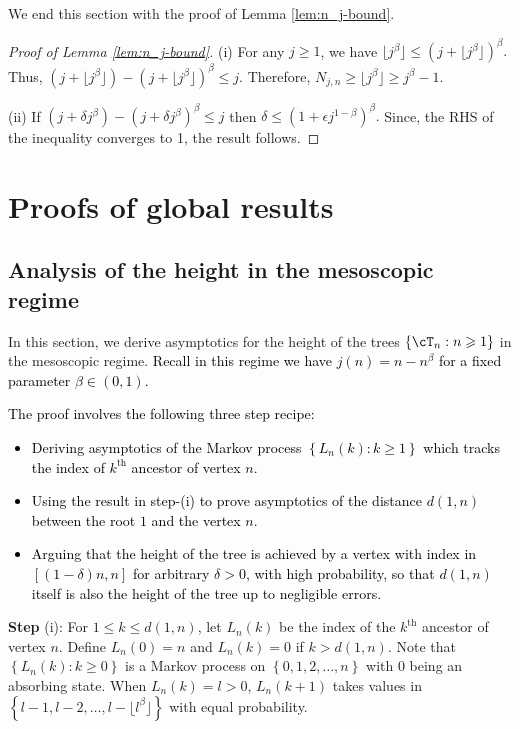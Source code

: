 \documentclass[letterpaper,11pt,reqno]{amsart}
\theoremstyle{definition}
\renewcommand{\le}{\leqslant}
\renewcommand{\leq}{\leqslant}
\renewcommand{\geq}{\geqslant}
\newcommand{\set}[1]{\left\{#1\right\}}
\begin{document}
We end this section with the proof of Lemma \ref{lem:n_j-bound}.
\begin{proof}[Proof of Lemma \ref{lem:n_j-bound}]

    (i) For any $j \geq 1$, we have $\lfloor j^\beta\rfloor \leq (j+\lfloor j^\beta\rfloor)^\beta.$ Thus, $(j+\lfloor j^\beta\rfloor) - (j+\lfloor j^\beta\rfloor)^\beta \leq j.$ Therefore, $N_{j,n} \geq \lfloor j^\beta\rfloor \geq j^\beta -1.$

    (ii) If $(j+\delta j^\beta) - (j+\delta j^\beta)^\beta \leq j$ then $\delta \leq  (1+\epsilon j^{1-\beta})^\beta.$ Since, the RHS of the inequality converges to 1, the result follows. 

\end{proof}

\section{Proofs of global results}

\subsection{Analysis of the height in the mesoscopic regime}

In this section, we derive asymptotics for the height of the trees $\set{\cT_n:n\geq 1}$ in the mesoscopic regime. \textcolor{black}{Recall in this regime we have $j(n)=n-n^{\beta}$ for a fixed parameter $\beta \in (0,1)$.} \textcolor{black}{The proof involves the following three step recipe:
\begin{itemize}
    \item[(i)] Deriving asymptotics of the Markov process $\set{L_n(k):k\geq 1}$ which tracks the index of $k^{\text{th}}$ ancestor of vertex $n$.
    \item[(ii)] Using the result in step-(i) to prove asymptotics of the distance $d(1,n)$ between the root $1$ and the vertex $n$.
    \item[(iii)] Arguing that the height of the tree is achieved by a vertex with index in $[(1-\delta) n,n]$ for arbitrary $\delta>0$, with high probability, so that $d(1,n)$ itself is also the height of the tree up to negligible errors. 
\end{itemize}
}


\textbf{Step} (i): For $1\le k\le d(1,n)$, let $L_n(k)$ be the index of the $k^{\text{th}}$ ancestor of vertex $n$. Define $L_n(0)=n$ and $L_n(k)=0$ if $k > d(1,n)$. Note that $\set{L_n(k):k\geq 0}$ is a Markov process on $\set{0,1,2,\dots,n}$ with $0$ being an absorbing state. When $L_n(k) = l > 0$, $L_n(k+1)$ takes values in $\set{l-1,l-2,\dots,l-\lfloor l^\beta \rfloor}$ with equal probability. 
\end{document}
